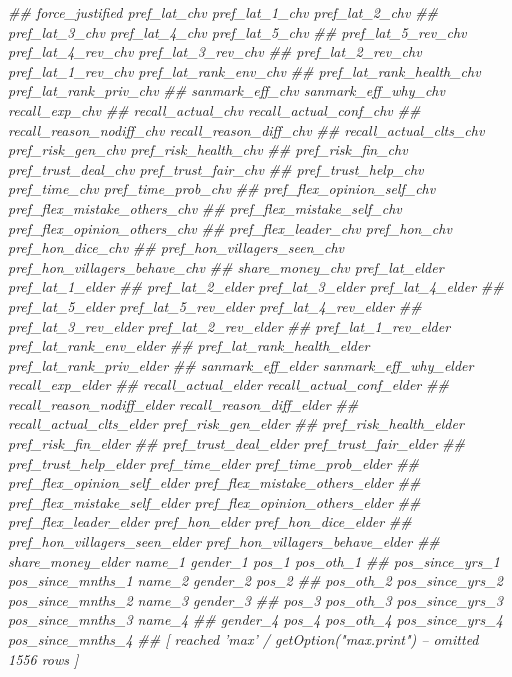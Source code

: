 \documentclass[
]{article}
\newenvironment{Shaded}{\begin{snugshade}}{\end{snugshade}}
\newcommand{\CommentTok}[1]{\textcolor[rgb]{0.56,0.35,0.01}{\textit{#1}}}
\begin{document}
\begin{Shaded}
\begin{Highlighting}[]
\CommentTok{##      force_justified pref_lat_chv pref_lat_1_chv pref_lat_2_chv}
\CommentTok{##      pref_lat_3_chv pref_lat_4_chv pref_lat_5_chv}
\CommentTok{##      pref_lat_5_rev_chv pref_lat_4_rev_chv pref_lat_3_rev_chv}
\CommentTok{##      pref_lat_2_rev_chv pref_lat_1_rev_chv pref_lat_rank_env_chv}
\CommentTok{##      pref_lat_rank_health_chv pref_lat_rank_priv_chv}
\CommentTok{##      sanmark_eff_chv sanmark_eff_why_chv recall_exp_chv}
\CommentTok{##      recall_actual_chv recall_actual_conf_chv}
\CommentTok{##      recall_reason_nodiff_chv recall_reason_diff_chv}
\CommentTok{##      recall_actual_clts_chv pref_risk_gen_chv pref_risk_health_chv}
\CommentTok{##      pref_risk_fin_chv pref_trust_deal_chv pref_trust_fair_chv}
\CommentTok{##      pref_trust_help_chv pref_time_chv pref_time_prob_chv}
\CommentTok{##      pref_flex_opinion_self_chv pref_flex_mistake_others_chv}
\CommentTok{##      pref_flex_mistake_self_chv pref_flex_opinion_others_chv}
\CommentTok{##      pref_flex_leader_chv pref_hon_chv pref_hon_dice_chv}
\CommentTok{##      pref_hon_villagers_seen_chv pref_hon_villagers_behave_chv}
\CommentTok{##      share_money_chv pref_lat_elder pref_lat_1_elder}
\CommentTok{##      pref_lat_2_elder pref_lat_3_elder pref_lat_4_elder}
\CommentTok{##      pref_lat_5_elder pref_lat_5_rev_elder pref_lat_4_rev_elder}
\CommentTok{##      pref_lat_3_rev_elder pref_lat_2_rev_elder}
\CommentTok{##      pref_lat_1_rev_elder pref_lat_rank_env_elder}
\CommentTok{##      pref_lat_rank_health_elder pref_lat_rank_priv_elder}
\CommentTok{##      sanmark_eff_elder sanmark_eff_why_elder recall_exp_elder}
\CommentTok{##      recall_actual_elder recall_actual_conf_elder}
\CommentTok{##      recall_reason_nodiff_elder recall_reason_diff_elder}
\CommentTok{##      recall_actual_clts_elder pref_risk_gen_elder}
\CommentTok{##      pref_risk_health_elder pref_risk_fin_elder}
\CommentTok{##      pref_trust_deal_elder pref_trust_fair_elder}
\CommentTok{##      pref_trust_help_elder pref_time_elder pref_time_prob_elder}
\CommentTok{##      pref_flex_opinion_self_elder pref_flex_mistake_others_elder}
\CommentTok{##      pref_flex_mistake_self_elder pref_flex_opinion_others_elder}
\CommentTok{##      pref_flex_leader_elder pref_hon_elder pref_hon_dice_elder}
\CommentTok{##      pref_hon_villagers_seen_elder pref_hon_villagers_behave_elder}
\CommentTok{##      share_money_elder name_1 gender_1 pos_1 pos_oth_1}
\CommentTok{##      pos_since_yrs_1 pos_since_mnths_1 name_2 gender_2 pos_2}
\CommentTok{##      pos_oth_2 pos_since_yrs_2 pos_since_mnths_2 name_3 gender_3}
\CommentTok{##      pos_3 pos_oth_3 pos_since_yrs_3 pos_since_mnths_3 name_4}
\CommentTok{##      gender_4 pos_4 pos_oth_4 pos_since_yrs_4 pos_since_mnths_4}
\CommentTok{##  [ reached 'max' / getOption("max.print") -- omitted 1556 rows ]}


\end{Highlighting}
\end{Shaded}
\end{document}
